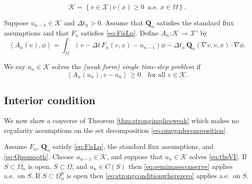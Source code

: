 \documentclass[final,leqno,onefignum,onetabnum]{siamltex1213bueler}
\newcommand\bQ{\mathbf{Q}}
\renewcommand{\grad}{\nabla}
\newcommand{\ip}[2]{\ensuremath{\left<#1,#2\right>}}
\begin{document}
\begin{definition}
\begin{equation}
\mathcal{K} = \left\{v \in \mathcal{X} \,\big|\, v(x) \ge 0\, \text{ a.e.~} x \in \Omega\right\}.  \label{eq:defineK}
\end{equation}
\end{definition}

\begin{definition}  Suppose $u_{n-1}\in\mathcal{K}$ and $\Delta t_n>0$.  Assume that $\bQ_n$ satisfies the standard flux assumptions and that $F_n$ satisfies \eqref{eq:FisLq}.  Define $A_n:\mathcal{K} \to \mathcal{X}'$ by
\begin{equation}
  \ip{A_n(v)}{\phi} = \int_\Omega \left(v - \Delta t\, F_n(v,x) - u_{n-1}\right)\phi - \Delta t_n\, \bQ_n(\grad v,v,x) \cdot \grad\phi. \label{eq:defineAn}
\end{equation}
\end{definition}

\begin{definition}  We say $u_n\in\mathcal{K}$ solves the \emph{(weak form) single time-step problem} if
\begin{equation}
  \ip{A_n(u_n)}{v-u_n} \ge 0 \quad \text{for all } v \in \mathcal{K}.  \label{eq:theVI}
\end{equation}
\end{definition}

\subsection{Interior condition}  \label{subsec:interior}  We now show a converse of Theorem \ref{thm:strongimpliesweak} which makes no regularity assumptions on the set decomposition \eqref{eq:omegadecomposition}.

\begin{theorem} \label{thm:weakimpliesstrong}  Assume $F_n$, $\bQ_n$ satisfy \eqref{eq:FisLq}, the standard flux assumptions, and \eqref{eq:Qissmooth}.  Choose $u_{n-1}\in\mathcal{K}$, and suppose that $u_n\in\mathcal{K}$ solves \eqref{eq:theVI}.  If $S \subset \Omega_n$ is open, $\overline{S}\subset \Omega$, and $u_n\in C(S)$ then \eqref{eq:semimassconserve} applies a.e.~on $S$.  If $S \subset \Omega_n^0$ is open then \eqref{eq:strongconditionwherezero} applies a.e.~on $S$.
\end{theorem}
\end{document}
